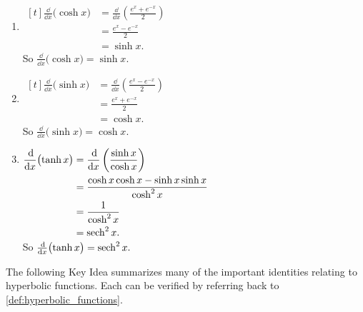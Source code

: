 \begin{example}
\begin{enumerate}
\item \hfill$\begin{aligned}[t]
	\frac{\dd}{\dd x}\bigl(\cosh x\bigr)
	&= \frac{\dd}{\dd x}\left(\frac{e^x+e^{-x}}2\right) \\
	&= \frac{e^x-e^{-x}}2\\
	&= \sinh x.
\end{aligned}$\hfill\null\\
So $\frac{\dd}{\dd x}\bigl(\cosh x\bigr) = \sinh x.$
	
\item \hfill$\begin{aligned}[t]
	\frac{\dd}{\dd x}\bigl(\sinh x\bigr)
	&= \frac{\dd}{\dd x}\left(\frac{e^x-e^{-x}}2\right) \\
	&= \frac{e^x+e^{-x}}2\\
	&= \cosh x.
\end{aligned}$\hfill\null\\
So $\frac{\dd}{\dd x}\bigl(\sinh x\bigr) = \cosh x.$

\item \hfill$\begin{aligned}[t]
	\frac{\operatorname{d}\!}{\operatorname{d}\! x}\bigl(\tanh x\bigr)
	&= \frac{\operatorname{d}\!}{\operatorname{d}\! x}\left(\frac{\sinh x}{\cosh x}\right) \\
	&= \frac{\cosh x \cosh x - \sinh x \sinh x}{\cosh^2 x}\\
	&= \frac{1}{\cosh^2 x}\\
	&= \operatorname{sech}^2 x.
\end{aligned}$\hfill\null\\
So $\frac{\operatorname{d}\!}{\operatorname{d}\! x}\bigl(\tanh x\bigr) = \operatorname{sech}^2 x.$
\end{enumerate}
\end{example}

The following Key Idea summarizes many of the important identities relating to hyperbolic functions. Each can be verified by referring back to \autoref{def:hyperbolic_functions}.

